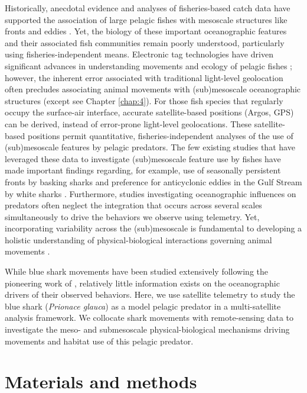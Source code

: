 Historically, anecdotal evidence and analyses of fisheries-based catch data have supported the association of large pelagic fishes with mesoscale structures like fronts and eddies \citep{Hobday2014}. Yet, the biology of these important oceanographic features and their associated fish communities remain poorly understood, particularly using fisheries-independent means. Electronic tag technologies have driven significant advances in understanding movements and ecology of pelagic fishes \citep{Skomal2009, Block2011, Thorrold2014, Berumen2014, Werry2014}; however, the inherent error associated with traditional light-level geolocation \citep[$\pm$ 100 km,][]{Braun2015, Braun2018b} often precludes associating animal movements with (sub)mesoscale oceanographic structures (except see Chapter \ref{chap:4}). For those fish species that regularly occupy the surface-air interface, accurate satellite-based positions (\eg Argos, GPS) can be derived, instead of error-prone light-level geolocations. These satellite-based positions permit quantitative, fisheries-independent analyses of the use of (sub)mesoscale features by pelagic predators. The few existing studies that have leveraged these data to investigate (sub)mesoscale feature use by fishes have made important findings regarding, for example, use of seasonally persistent fronts by basking sharks \citep{Miller2015} and preference for anticyclonic eddies in the Gulf Stream by white sharks \citep{Gaube2018}. Furthermore, studies investigating oceanographic influences on predators often neglect the integration that occurs across several scales simultaneously to drive the behaviors we observe using telemetry. Yet, incorporating variability across the (sub)mesoscale is fundamental to developing a holistic understanding of physical-biological interactions governing animal movements \citep{Fauchald2000}.

While blue shark movements have been studied extensively following the pioneering work of \citeauthor{Carey1990} \citep{Queiroz2010, Campana2016, Vandeperre2014a}, relatively little information exists on the oceanographic drivers of their observed behaviors. Here, we use satellite telemetry to study the blue shark (\textit{Prionace glauca}) as a model pelagic predator in a multi-satellite analysis framework. We collocate shark movements with remote-sensing data to investigate the meso- and submesoscale physical-biological mechanisms driving movements and habitat use of this pelagic predator. 

\section{Materials and methods}

